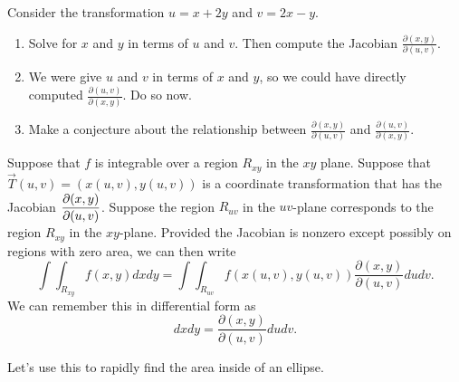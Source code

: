 \begin{problem}
Consider the transformation $u=x+2y$ and $v=2x-y$.  
\begin{enumerate}
 \item Solve for $x$ and $y$ in terms of $u$ and $v$. Then compute the Jacobian $\frac{\partial (x,y)}{\partial (u,v)}$.
 \item We were give $u$ and $v$ in terms of $x$ and $y$, so we could have directly computed $\frac{\partial (u,v)}{\partial (x,y)}$. Do so now.
 \item Make a conjecture about the relationship between $\frac{\partial (x,y)}{\partial (u,v)}$ and $\frac{\partial (u,v)}{\partial (x,y)}$. 
\end{enumerate}
\end{problem}

\begin{theorem}
 Suppose that $f$ is integrable over a region $R_{xy}$ in the $xy$ plane. Suppose that $\vec T(u,v)=(x(u,v),y(u,v))$ is a coordinate transformation that has the Jacobian $\displaystyle \frac{\partial (x,y)}{\partial (u,v)} $. Suppose the region $R_{uv}$ in the $uv$-plane corresponds to the region $R_{xy}$ in the $xy$-plane. Provided the Jacobian is nonzero except possibly on regions with zero area, we can then write  
$$\int\int_{R_{xy}} f(x,y) dxdy = \int\int_{R_{uv}} f(x(u,v),y(u,v)) \frac{\partial (x,y)}{\partial (u,v)} dudv.$$
 We can remember this in differential form as 
$$dxdy = \frac{\partial (x,y)}{\partial (u,v)} dudv.$$
\end{theorem}

Let's use this to rapidly find the area inside of an ellipse.

